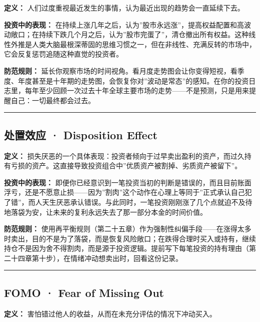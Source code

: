 \documentclass[a4paper,11pt,oneside,fontset=none,UTF8,zihao=-4]{ctexbook}
\begin{document}
\textbf{定义：}
人们过度重视最近发生的事情，认为最近出现的趋势会一直延续下去。

\textbf{投资中的表现：}
在持续上涨几年之后，认为''股市永远涨''，提高权益配置和高波动敞口；在持续下跌几个月之后，认为''股市完蛋了''，清仓撤出所有权益。这种线性外推是人类大脑最根深蒂固的思维习惯之一，但在非线性、充满反转的市场中，它会反复惩罚追随这种直觉的投资者。

\textbf{防范规则：}
延长你观察市场的时间视角。看月度走势图会让你变得短视，看季度、年度甚至是十年期的走势图，会恢复你对''波动是常态''的感知。在你的投资日志里，每年至少回顾一次过去十年全球主要市场的走势------不是预测，只是用来提醒自己：一切最终都会过去。

\begin{center}{\color{dh-bronze}\rule{0.2\textwidth}{0.5pt}}\end{center}

\subsection{处置效应 · Disposition
Effect}\label{ux5904ux7f6eux6548ux5e94-disposition-effect}

\textbf{定义：}
损失厌恶的一个具体表现：投资者倾向于过早卖出盈利的资产，而过久持有亏损的资产。这直接导致投资组合中''优质资产被割掉、劣质资产被留下''。

\textbf{投资中的表现：}
即便你已经意识到一笔投资当初的判断是错误的，而且目前账面浮亏，还是不愿意止损------因为''割肉''这个动作在心理上等同于''正式承认自己犯了错''，而人天生厌恶承认错误。与此同时，一笔投资刚刚涨了几个点就迫不及待地落袋为安，让未来的复利永远失去了那一部分本金的时间价值。

\textbf{防范规则：}
使用再平衡规则（第二十五章）作为强制性纠偏手段------在涨得太多时卖出，目的不是为了落袋，而是恢复风险敞口；在跌得合理时买入或持有，继续持仓不是因为舍不得割肉，而是源于投资逻辑。提前写下每笔投资的持有理由（第二十四章第十步），在情绪冲动想卖出时，回看这份记录。

\begin{center}{\color{dh-bronze}\rule{0.2\textwidth}{0.5pt}}\end{center}

\subsection{FOMO · Fear of Missing Out}\label{fomo-fear-of-missing-out}

\textbf{定义：} 害怕错过他人的收益，从而在未充分评估的情况下冲动买入。
\end{document}
